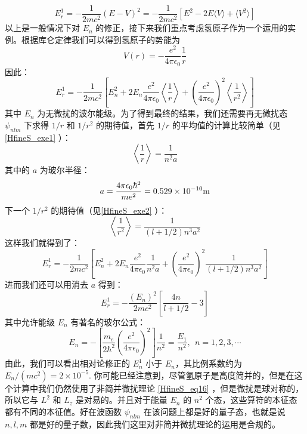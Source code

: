 \begin{equation}
E_r^1=-\frac{1}{2mc^2}(E-V)^2=-\frac{1}{2mc^2}[E^2-2E\langle V\rangle+\langle V^2\rangle]
\end{equation}
以上是一般情况下对 $E_n$ 的修正，接下来我们重点考虑氢原子作为一个运用的实例。根据库仑定律我们可以得到氢原子的势能为
\begin{equation}
V(r)=-\frac{e^2}{4\pi\epsilon_0}\frac{1}{r}
\end{equation}
因此：
\begin{equation}
E_r^1=-\frac{1}{2mc^2}\left[E_n^2+2E_n\frac{e^2}{4\pi\epsilon_0}\left\langle \frac{1}{r}\right\rangle+\left(\frac{e^2}{4\pi\epsilon_0}\right)^2\left\langle \frac{1}{r^2}\right\rangle\right]
\end{equation}
其中 $E_n$ 为无微扰的波尔能级。为了得到最终的结果，我们还需要再无微扰态 $\psi_{nlm}$ 下求得 $1/r$ 和 $1/r^2$ 的期待值，首先 $1/r$ 的平均值的计算比较简单（见\autoref{HfineS_exe1} ）：
\begin{equation}
\left\langle\frac{1}{r}\right\rangle = \frac{1}{n^2a}
\end{equation}
其中的 $a$ 为玻尔半径：
\begin{equation}
a=\frac{4\pi\epsilon_0\hbar^2}{me^2}=0.529\times 10^{-10}\rm{m}
\end{equation}
下一个 $1/r^2$ 的期待值（见\autoref{HfineS_exe2} ）：
\begin{equation}
\left\langle \frac{1}{r^2}\right\rangle = \frac{1}{(l+1/2)n^3a^2}
\end{equation}
这样我们就得到了：
\begin{equation}
E_r^1=-\frac{1}{2mc^2}\left[E_n^2+2E_n\frac{e^2}{4\pi\epsilon_0}\frac{1}{n^2a}+\left(\frac{e^2}{4\pi\epsilon_0}\right)^2\frac{1}{(l+1/2)n^3a^2}\right]
\end{equation}
进而我们还可以用消去 $a$ 得到：
\begin{equation}\label{HfineS_eq21}
E_r^1=-\frac{(E_n)^2}{2mc^2}\left[\frac{4n}{l+1/2}-3\right]
\end{equation}
其中允许能级 $E_n$ 有著名的玻尔公式：
\begin{equation}
E_{n} =-\left[\frac {m_e}{2\hbar^{2}} \left(\frac {e^ {2}}{4\pi \epsilon_0}\right)^ {2}\right]  \frac {1}{n^ {2}}  =  \frac {E_ {1}}{n^ {2}}, \ \  n=1,2,3, \cdots 
\end{equation}
由此，我们可以看出相对论修正的 $E^1_n$ 小于 $E_n$，其比例系数约为 $E_n/(mc^2)=2\times 10^{-5}$.
你可能已经注意到，尽管氢原子是高度简并的，但是在这个计算中我们仍然使用了非简并微扰理论 \autoref{HfineS_eq16} ，但是微扰是球对称的，所以它与 $L^2$ 和 $L_z$ 是对易的。并且对于能量 $E_n$ 的 $n^2$ 个态，这些算符的本征态都有不同的本征值。好在波函数 $\psi_{nlm}$ 在该问题上都是好的量子态，也就是说 $n,l,m$ 都是好的量子数，因此我们这里对非简并微扰理论的运用是合规的。

